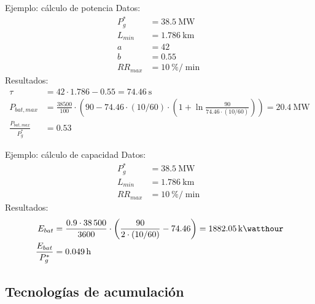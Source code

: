 \documentclass[aspectratio=169, usenames,svgnames,dvipsnames]{beamer}
\begin{document}
\begin{frame}[label={sec:org402d027}]{Ejemplo: cálculo de potencia}
Datos:
\begin{align*}
  P_g^* &= \qty{38.5}{\mega\watt}\\
  L_{min} &= \qty{1.786}{\kilo\meter}\\
  a &= 42\\
  b &= 0.55\\
  RR_{max} &= \qty{10}{\%\per\min}
\end{align*}
Resultados:
\begin{align*}
  \tau &= 42 \cdot \num{1.786} - \num{0.55} = \qty{74.46}{\second}\\
  P_{bat,max} &= \frac{\num{38500}}{100} \cdot \left(90 - \num{74.46} \cdot (10/60) \cdot \left( 1 + \ln\frac{90}{\num{74.46} \cdot (10/60)}\right) \right) = \qty{20.4}{\mega\watt}\\
  \frac{P_{bat,max}}{P_g^*} &= \num{0.53}
\end{align*}
\end{frame}

\begin{frame}[label={sec:org10fabc7}]{Ejemplo: cálculo de capacidad}
Datos:
\begin{align*}
  P_g^* &= \qty{38.5}{\mega\watt}\\
  L_{min} &= \qty{1.786}{\kilo\meter}\\
  RR_{max} &= \qty{10}{\%\per\min}
\end{align*}
Resultados:
\begin{align*}
  E_{bat} &= \frac{\num{0.9} \cdot \num{38500}}{\num{3600}} \cdot \left( \frac{90}{2 \cdot (10/60)} - \num{74.46} \right) = \qty{1882.05}{\kilo\watthour}\\
  \frac{E_{bat}}{P_g^*} &= \qty{0.049}{\hour} 
\end{align*}
\end{frame}

\subsection{Tecnologías de acumulación}
\label{sec:org1cad59e}
\end{document}
